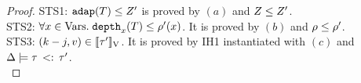 \begin{proof}
STS1: $\mathtt{adap}(T) \leq Z' $ is proved by $(a)$ and $Z \leq
Z'$. \\
STS2: $\forall x \in \mbox{Vars}.\;  \mathtt{depth}_{x}(T) \leq
\rho'(x)$. It is proved by $(b)$ and $\rho \leq \rho'$. \\
STS3: $ (k - j,  v) \in [\![ \tau' ]\!]_{\text{V}}$. It is proved by
IH1 instantiated with $(c)$  and $ \Delta \models \tau \, <: \, \tau'$.\\


\end{proof}